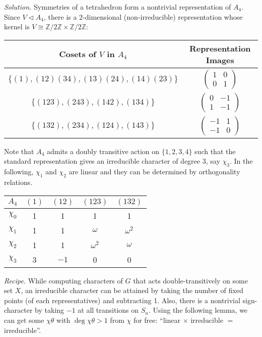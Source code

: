\documentclass{mathproblems}
\newcommand\Z{\mathbb{Z}}
\begin{document}
\begin{questions}
\textit{Solution.} Symmetries of a tetrahedron form a nontrivial representation of $A_4$. Since $V\triangleleft A_4$, there is a 2-dimensional (non-irreducible) representation whose kernel is $V\cong \Z/2\Z\times \Z/2\Z$:
\begin{center}
\begin{tabular}{c|c}
Cosets of $V$ in $A_4$ & Representation Images \\
\hline
$\{(1),(12)(34),(13)(24),(14)(23)\}$ & $\begin{pmatrix}
1 & 0 \\
0 & 1\end{pmatrix}$ \\
$\{(123),(243),(142),(134)\}$ & $\begin{pmatrix}0 & -1 \\
1 & -1\end{pmatrix}$ \\
$\{(132),(234),(124),(143)\}$ & $\begin{pmatrix}-1 & 1 \\
-1 & 0\end{pmatrix}$
\end{tabular}
\end{center}

Note that $A_4$ admits a doubly transitive action on $\{1,2,3,4\}$ such that the standard representation gives an irreducible character of degree 3, say $\chi_3$. In the following, $\chi_1$ and $\chi_2$ are linear and they can be determined by orthogonality relations.
\begin{center}
\begin{tabular}{c|cccc}
$A_4$ & $(1)$ & $(12)$ & $(123)$ & $(132)$\\
\hline
$\chi_0$ & 1 & 1 & 1 & 1\\
$\chi_1$ & 1 & 1 & $\omega$ & $\omega^2$\\
$\chi_2$ & 1 & 1 & $\omega^2$ & $\omega$\\
$\chi_3$ & 3 & $-1$ & 0 & 0\\
\end{tabular}
\end{center}



{\color{violet}
\textit{Recipe.} While computing characters of $G$ that acts double-transitively on some set $X$, an irreducible character can be attained by taking the number of fixed points (of each representatives) and subtracting 1. Also, there is a nontrivial sign-character by taking $-1$ at all transitions on $S_n$. Using the following lemma, we can get some $\chi\theta$ with $\deg\chi\theta>1$ from $\chi$ for free: ``linear $\times$ irreducible $=$ irreducible''.

}
\end{questions}
\end{document}
